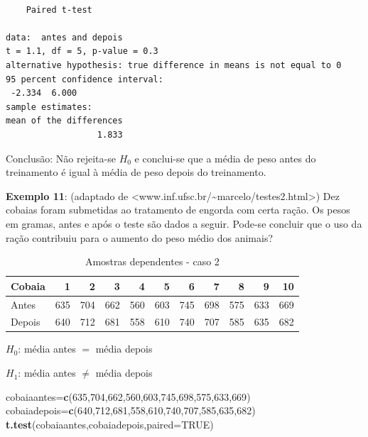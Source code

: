 \documentclass[12pt,brazil,oneside]{book}
\newenvironment{Shaded}{\begin{snugshade}}{\end{snugshade}}
\newcommand{\DataTypeTok}[1]{\textcolor[rgb]{0.13,0.29,0.53}{#1}}
\newcommand{\DecValTok}[1]{\textcolor[rgb]{0.00,0.00,0.81}{#1}}
\newcommand{\KeywordTok}[1]{\textcolor[rgb]{0.13,0.29,0.53}{\textbf{#1}}}
\newcommand{\NormalTok}[1]{#1}
\newcommand{\OtherTok}[1]{\textcolor[rgb]{0.56,0.35,0.01}{#1}}
\begin{document}
\begin{verbatim}

    Paired t-test

data:  antes and depois
t = 1.1, df = 5, p-value = 0.3
alternative hypothesis: true difference in means is not equal to 0
95 percent confidence interval:
 -2.334  6.000
sample estimates:
mean of the differences 
                  1.833 
\end{verbatim}

Conclusão: Não rejeita-se \(H_0\) e conclui-se que a média de peso antes do treinamento é igual à média de peso depois do treinamento.

\textbf{Exemplo 11}: (adaptado de \textless{}www.inf.ufsc.br/\textasciitilde{}marcelo/testes2.html\textgreater{}) Dez cobaias foram submetidas ao tratamento de engorda com certa ração. Os pesos em gramas, antes e após o teste são dados a seguir. Pode-se concluir que o uso da ração contribuiu para o aumento do peso médio dos animais?

\begin{table}[t]

\caption{\label{tab:unnamed-chunk-145}Amostras dependentes - caso 2}
\centering
\begin{tabular}{l|r|r|r|r|r|r|r|r|r|r}
\hline
Cobaia & 1 & 2 & 3 & 4 & 5 & 6 & 7 & 8 & 9 & 10\\
\hline
Antes & 635 & 704 & 662 & 560 & 603 & 745 & 698 & 575 & 633 & 669\\
\hline
Depois & 640 & 712 & 681 & 558 & 610 & 740 & 707 & 585 & 635 & 682\\
\hline
\end{tabular}
\end{table}

\textbf{\(H_0\)}: média antes \(=\) média depois

\textbf{\(H_1\)}: média antes \(\neq\) média depois

\begin{Shaded}
\begin{Highlighting}[]
\NormalTok{cobaiaantes=}\KeywordTok{c}\NormalTok{(}\DecValTok{635}\NormalTok{,}\DecValTok{704}\NormalTok{,}\DecValTok{662}\NormalTok{,}\DecValTok{560}\NormalTok{,}\DecValTok{603}\NormalTok{,}\DecValTok{745}\NormalTok{,}\DecValTok{698}\NormalTok{,}\DecValTok{575}\NormalTok{,}\DecValTok{633}\NormalTok{,}\DecValTok{669}\NormalTok{)}
\NormalTok{cobaiadepois=}\KeywordTok{c}\NormalTok{(}\DecValTok{640}\NormalTok{,}\DecValTok{712}\NormalTok{,}\DecValTok{681}\NormalTok{,}\DecValTok{558}\NormalTok{,}\DecValTok{610}\NormalTok{,}\DecValTok{740}\NormalTok{,}\DecValTok{707}\NormalTok{,}\DecValTok{585}\NormalTok{,}\DecValTok{635}\NormalTok{,}\DecValTok{682}\NormalTok{)}
\KeywordTok{t.test}\NormalTok{(cobaiaantes,cobaiadepois,}\DataTypeTok{paired=}\OtherTok{TRUE}\NormalTok{)}
\end{Highlighting}
\end{Shaded}
\end{document}
